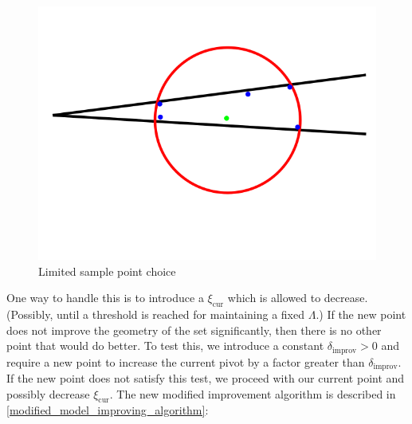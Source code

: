 \begin{figure}[ht]
    \centering
    \includegraphics[scale=0.4]{images/bad_lambda.png}
    \caption{Limited sample point choice}
    \label{lspc}
\end{figure}


One way to handle this is to introduce a $\xi_{\text{cur}}$ which is allowed to decrease.
(Possibly, until a threshold is reached for maintaining a fixed $\Lambda$.)
If the new point does not improve the geometry of the set significantly, then there is no other point that would do better.
To test this, we introduce a constant $\delta_{\text{improv}}>0$ and require a new point to increase the current pivot by a factor greater than $\delta_{\text{improv}}$.
If the new point does not satisfy this test, we proceed with our current point and possibly decrease $\xi_{\text{cur}}$.
The new modified improvement algorithm is described in \cref{modified_model_improving_algorithm}:

